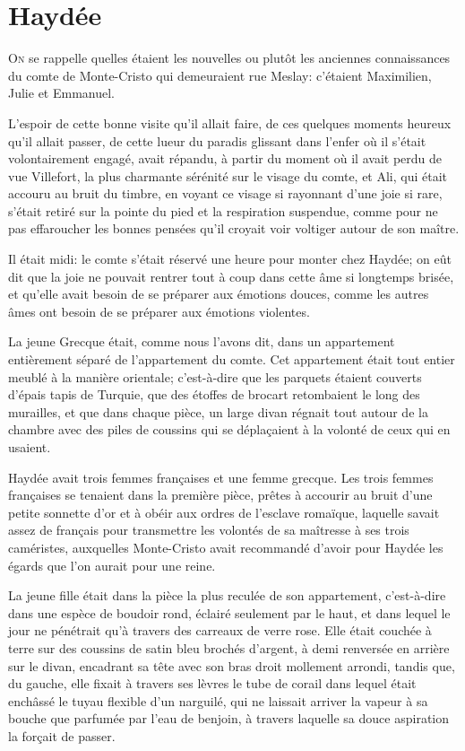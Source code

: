 \chapter{Haydée}

\lettrine{O}{n} se rappelle quelles étaient les nouvelles ou plutôt les anciennes connaissances du comte de Monte-Cristo qui demeuraient rue Meslay: c'étaient Maximilien, Julie et Emmanuel. 

\zz
L'espoir de cette bonne visite qu'il allait faire, de ces quelques moments heureux qu'il allait passer, de cette lueur du paradis glissant dans l'enfer où il s'était volontairement engagé, avait répandu, à partir du moment où il avait perdu de vue Villefort, la plus charmante sérénité sur le visage du comte, et Ali, qui était accouru au bruit du timbre, en voyant ce visage si rayonnant d'une joie si rare, s'était retiré sur la pointe du pied et la respiration suspendue, comme pour ne pas effaroucher les bonnes pensées qu'il croyait voir voltiger autour de son maître. 

Il était midi: le comte s'était réservé une heure pour monter chez Haydée; on eût dit que la joie ne pouvait rentrer tout à coup dans cette âme si longtemps brisée, et qu'elle avait besoin de se préparer aux émotions douces, comme les autres âmes ont besoin de se préparer aux émotions violentes. 

La jeune Grecque était, comme nous l'avons dit, dans un appartement entièrement séparé de l'appartement du comte. Cet appartement était tout entier meublé à la manière orientale; c'est-à-dire que les parquets étaient couverts d'épais tapis de Turquie, que des étoffes de brocart retombaient le long des murailles, et que dans chaque pièce, un large divan régnait tout autour de la chambre avec des piles de coussins qui se déplaçaient à la volonté de ceux qui en usaient. 

Haydée avait trois femmes françaises et une femme grecque. Les trois femmes françaises se tenaient dans la première pièce, prêtes à accourir au bruit d'une petite sonnette d'or et à obéir aux ordres de l'esclave romaïque, laquelle savait assez de français pour transmettre les volontés de sa maîtresse à ses trois caméristes, auxquelles Monte-Cristo avait recommandé d'avoir pour Haydée les égards que l'on aurait pour une reine. 

La jeune fille était dans la pièce la plus reculée de son appartement, c'est-à-dire dans une espèce de boudoir rond, éclairé seulement par le haut, et dans lequel le jour ne pénétrait qu'à travers des carreaux de verre rose. Elle était couchée à terre sur des coussins de satin bleu brochés d'argent, à demi renversée en arrière sur le divan, encadrant sa tête avec son bras droit mollement arrondi, tandis que, du gauche, elle fixait à travers ses lèvres le tube de corail dans lequel était enchâssé le tuyau flexible d'un narguilé, qui ne laissait arriver la vapeur à sa bouche que parfumée par l'eau de benjoin, à travers laquelle sa douce aspiration la forçait de passer. 

